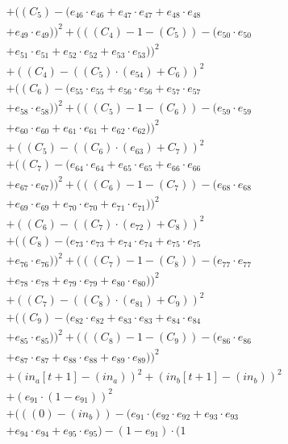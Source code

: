\documentclass[10pt, a4paper]{article}
\begin{document}
\begin{align*}
& + ((C_{5}) - (e_{46} \cdot e_{46} + e_{47} \cdot e_{47} + e_{48} \cdot e_{48} \\
& + e_{49} \cdot e_{49}))^{2} + (((C_{4}) - 1 - (C_{5})) - (e_{50} \cdot e_{50} \\
& + e_{51} \cdot e_{51} + e_{52} \cdot e_{52} + e_{53} \cdot e_{53}))^{2} \\
& + ((C_{4}) - ((C_{5})  \cdot  (e_{54}) + C_{6}))^{2} \\
& + ((C_{6}) - (e_{55} \cdot e_{55} + e_{56} \cdot e_{56} + e_{57} \cdot e_{57} \\
& + e_{58} \cdot e_{58}))^{2} + (((C_{5}) - 1 - (C_{6})) - (e_{59} \cdot e_{59} \\
& + e_{60} \cdot e_{60} + e_{61} \cdot e_{61} + e_{62} \cdot e_{62}))^{2} \\
& + ((C_{5}) - ((C_{6})  \cdot  (e_{63}) + C_{7}))^{2} \\
& + ((C_{7}) - (e_{64} \cdot e_{64} + e_{65} \cdot e_{65} + e_{66} \cdot e_{66} \\
& + e_{67} \cdot e_{67}))^{2} + (((C_{6}) - 1 - (C_{7})) - (e_{68} \cdot e_{68} \\
& + e_{69} \cdot e_{69} + e_{70} \cdot e_{70} + e_{71} \cdot e_{71}))^{2} \\
& + ((C_{6}) - ((C_{7})  \cdot  (e_{72}) + C_{8}))^{2} \\
& + ((C_{8}) - (e_{73} \cdot e_{73} + e_{74} \cdot e_{74} + e_{75} \cdot e_{75} \\
& + e_{76} \cdot e_{76}))^{2} + (((C_{7}) - 1 - (C_{8})) - (e_{77} \cdot e_{77} \\
& + e_{78} \cdot e_{78} + e_{79} \cdot e_{79} + e_{80} \cdot e_{80}))^{2} \\
& + ((C_{7}) - ((C_{8})  \cdot  (e_{81}) + C_{9}))^{2} \\
& + ((C_{9}) - (e_{82} \cdot e_{82} + e_{83} \cdot e_{83} + e_{84} \cdot e_{84} \\
& + e_{85} \cdot e_{85}))^{2} + (((C_{8}) - 1 - (C_{9})) - (e_{86} \cdot e_{86} \\
& + e_{87} \cdot e_{87} + e_{88} \cdot e_{88} + e_{89} \cdot e_{89}))^{2} \\
& + (in_a[t+1] - (in_a))^{2} + (in_b[t+1] - (in_b))^{2} \\
& + (e_{91} \cdot (1 - e_{91}))^{2} \\
& + (((0) - (in_b)) - (e_{91} \cdot (e_{92} \cdot e_{92} + e_{93} \cdot e_{93} \\
& + e_{94} \cdot e_{94} + e_{95} \cdot e_{95}) - (1 - e_{91}) \cdot (1 \\

\end{align*}
\end{document}
